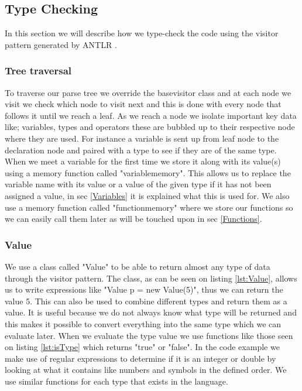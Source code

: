 \subsection{Type Checking}
\label{sec:typecheck}
In this section we will describe how we type-check the code using the visitor pattern generated by ANTLR \citep{ANTLR}.
\subsubsection{Tree traversal}
To traverse our parse tree we override the basevisitor class and at each node we visit we check which node to visit next and this is done with every node that follows it until we reach a leaf. As we reach a node we isolate important key data like; variables, types and operators these are bubbled up to their respective node where they are used. For instance a variable is sent up from leaf node to the declaration node and paired with a type to see if they are of the same type.
When we meet a variable for the first time we store it along with its value(s) using a memory function called "variablememory". This allows us to replace the variable name with its value or a value of the given type if it has not been assigned a value, in sec \ref{Variables} it is explained what this is used for. We also use a memory function called "functionmemory" where we store our functions so we can easily call them later as will be touched upon in sec \ref{Functions}.
\subsubsection{Value}
We use a class called "Value" to be able to return almost any type of data through the visitor pattern.
The class, as can be seen on listing \ref{lst:Value}, allows us to write expressions like "Value p = new Value(5)", thus we can return the value 5. This can also be used to combine different types and return them as a value. It is useful because we do not always know what type will be returned and this makes it possible to convert everything into the same type which we can evaluate later.
When we evaluate the type value we use functions like those seen on listing \ref{lst:isType} which returns "true" or "false". In the code example we make use of regular expressions to determine if it is an integer or double by looking at what it contains like numbers and symbols in the defined order. We use similar functions for each type that exists in the language.

